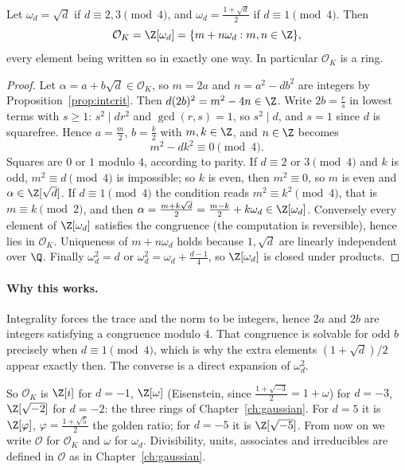\begin{proposition}\label{prop:OK}
Let $\omega_d=\sqrt d$ if $d\equiv2,3\pmod4$, and $\omega_d=\frac{1+\sqrt d}2$ if $d\equiv1\pmod4$. Then
\[
\mathcal O_K=\Z[\omega_d]=\{m+n\omega_d:m,n\in\Z\},
\]
every element being written so in exactly one way. In particular $\mathcal O_K$ is a ring.
\end{proposition}
\begin{proof}
Let $\alpha=a+b\sqrt d\in\mathcal O_K$, so $m=2a$ and $n=a^2-db^2$ are integers by Proposition~\ref{prop:intcrit}. Then $d(2b)^2=m^2-4n\in\Z$. Write $2b=\frac rs$ in lowest terms with $s\ge1$: $s^2\mid dr^2$ and $\gcd(r,s)=1$, so $s^2\mid d$, and $s=1$ since $d$ is squarefree. Hence $a=\frac m2$, $b=\frac k2$ with $m,k\in\Z$, and $n\in\Z$ becomes
\[
m^2-dk^2\equiv0\pmod4.
\]
Squares are $0$ or $1$ modulo $4$, according to parity. If $d\equiv2$ or $3\pmod4$ and $k$ is odd, $m^2\equiv d\pmod4$ is impossible; so $k$ is even, then $m^2\equiv0$, so $m$ is even and $\alpha\in\Z[\sqrt d]$. If $d\equiv1\pmod4$ the condition reads $m^2\equiv k^2\pmod 4$, that is $m\equiv k\pmod2$, and then $\alpha=\frac{m+k\sqrt d}2=\frac{m-k}2+k\omega_d\in\Z[\omega_d]$. Conversely every element of $\Z[\omega_d]$ satisfies the congruence (the computation is reversible), hence lies in $\mathcal O_K$. Uniqueness of $m+n\omega_d$ holds because $1,\sqrt d$ are linearly independent over $\Q$. Finally $\omega_d^2=d$ or $\omega_d^2=\omega_d+\frac{d-1}4$, so $\Z[\omega_d]$ is closed under products.
\end{proof}

\paragraph{Why this works.}
Integrality forces the trace and the norm to be integers, hence $2a$ and $2b$ are integers satisfying a congruence modulo $4$. That congruence is solvable for odd $b$ precisely when $d\equiv 1\pmod 4$, which is why the extra elements $(1+\sqrt d)/2$ appear exactly then. The converse is a direct expansion of $\omega_d^2$.

So $\mathcal O_K$ is $\Z[i]$ for $d=-1$, $\Z[\omega]$ (Eisenstein, since $\frac{1+\sqrt{-3}}2=1+\omega$) for $d=-3$, $\Z[\sqrt{-2}]$ for $d=-2$: the three rings of Chapter~\ref{ch:gaussian}. For $d=5$ it is $\Z[\varphi]$, $\varphi=\frac{1+\sqrt5}2$ the golden ratio; for $d=-5$ it is $\Z[\sqrt{-5}]$. From now on we write $\mathcal O$ for $\mathcal O_K$ and $\omega$ for $\omega_d$. Divisibility, units, associates and irreducibles are defined in $\mathcal O$ as in Chapter~\ref{ch:gaussian}.

